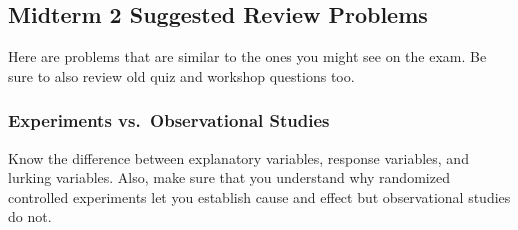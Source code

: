 \documentclass[12pt,answers]{exam}
\begin{document}
\subsection*{Midterm 2 Suggested Review Problems} 

Here are problems that are similar to the ones you might see on the
exam. Be sure to also review old quiz and workshop questions too.

\subsubsection*{Experiments vs.~Observational
Studies}\label{experiments-vs.-observational-studies}

Know the difference between explanatory variables, response variables,
and lurking variables. Also, make sure that you understand why
randomized controlled experiments let you establish cause and effect but
observational studies do not.
\end{document}
